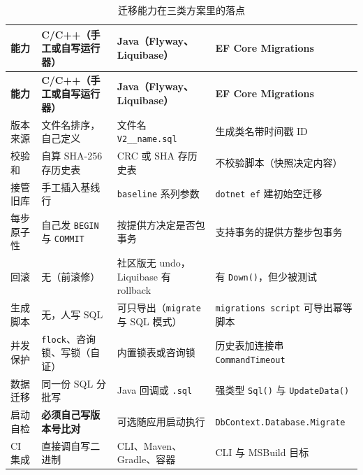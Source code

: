 \documentclass[12pt,a4paper,fontset=fandol]{ctexbook}
\newcommand{\Fn}[1]{\texttt{#1()}}
\newcommand{\Tp}[1]{\texttt{#1}}
\newcommand{\CppJava}{C/C++}
\begin{document}
\begin{scriptsize}
\setlength{\tabcolsep}{3pt}
\begin{longtable}{@{}>{\raggedright\arraybackslash}p{}
                  >{\raggedright\arraybackslash}p{}
                  >{\raggedright\arraybackslash}p{}
                  >{\raggedright\arraybackslash}p{}@{}}
\caption{迁移能力在三类方案里的落点} \\
\toprule
\textbf{能力} & \textbf{\CppJava{}（手工或自写运行器）} &
\textbf{Java（Flyway、Liquibase）} & \textbf{EF Core Migrations} \\
\midrule
\endfirsthead
\toprule
\textbf{能力} & \textbf{\CppJava{}（手工或自写运行器）} &
\textbf{Java（Flyway、Liquibase）} & \textbf{EF Core Migrations} \\
\midrule
\endhead
\bottomrule
\endfoot
版本来源 & 文件名排序，自己定义 & 文件名 \Tp{V2\_\_name.sql} & 生成类名带时间戳 ID \\
\addlinespace
校验和 & 自算 SHA-256 存历史表 & CRC 或 SHA 存历史表 & 不校验脚本（快照决定内容） \\
\addlinespace
接管旧库 & 手工插入基线行 & \Tp{baseline} 系列参数 & \Tp{dotnet ef} 建初始空迁移 \\
\addlinespace
每步原子性 & 自己发 \texttt{BEGIN} 与 \texttt{COMMIT} & 按提供方决定是否包事务 & 支持事务的提供方整步包事务 \\
\addlinespace
回滚 & 无（前滚修） & 社区版无 undo，Liquibase 有 rollback & 有 \Fn{Down}，但少被测试 \\
\addlinespace
生成脚本 & 无，人写 SQL & 可只导出（\texttt{migrate} 与 SQL 模式） & \Tp{migrations script} 可导出幂等脚本 \\
\addlinespace
并发保护 & \texttt{flock}、咨询锁、写锁（自证） & 内置锁表或咨询锁 & 历史表加连接串 \Tp{CommandTimeout} \\
\addlinespace
数据迁移 & 同一份 SQL 分批写 & Java 回调或 \texttt{.sql} & 强类型 \Fn{Sql} 与 \Fn{UpdateData} \\
\addlinespace
启动自检 & \textbf{必须自己写版本号比对} & 可选随应用启动执行 & \Tp{DbContext.\allowbreak Database.\allowbreak Migrate} \\
\addlinespace
CI 集成 & 直接调自写二进制 & CLI、Maven、Gradle、容器 & CLI 与 MSBuild 目标 \\
\end{longtable}
\setlength{\tabcolsep}{6pt}
\end{scriptsize}
\end{document}
